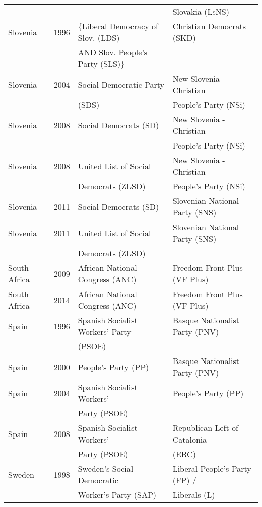 {\begin{longtable}{|l|c|l|l|}
               &      &         &  Slovakia (LsNS)   \\ 
   Slovenia & 1996 & $\lbrace$Liberal Democracy of Slov. (LDS)  &   Christian Democrats (SKD)   \\ 
    &   & AND Slov. People's Party (SLS)$\rbrace$&   \\ 
   Slovenia & 2004 &        Social Democratic Party &   New Slovenia - Christian    \\ 
               &      &      (SDS)    &    People's Party (NSi) \\ 
   Slovenia & 2008 &   Social Democrats (SD)  &   New Slovenia - Christian   \\ 
               &      &         &   People's Party (NSi)   \\ 
   Slovenia & 2008 &   United List of Social  &   New Slovenia - Christian   \\ 
               &      &     Democrats (ZLSD)    &   People's Party (NSi)   \\ 
   Slovenia & 2011 &   Social Democrats (SD)  &   Slovenian National Party (SNS) \\ 
   Slovenia & 2011 &   United List of Social  &   Slovenian National Party (SNS) \\ 
               &      &     Democrats (ZLSD)    &     \\ 
   South Africa & 2009 &   African National Congress (ANC)   &   Freedom Front Plus (VF Plus) \\ 
   South Africa & 2014 &   African National Congress (ANC)   &   Freedom Front Plus (VF Plus) \\ 
   Spain & 1996 &   Spanish Socialist Workers' Party  &   Basque Nationalist Party (PNV)   \\ 
               &      &     (PSOE)  &     \\ 
   Spain & 2000 &   People's Party (PP) &   Basque Nationalist Party (PNV)   \\ 
   Spain & 2004 &   Spanish Socialist Workers' &   People's Party (PP) \\ 
               &      &     Party (PSOE)     &     \\ 
  Spain & 2008 &   Spanish Socialist Workers'  &   Republican Left of Catalonia  \\ 
               &      &       Party (PSOE)  &    (ERC) \\ 
   Sweden & 1998 &   Sweden's   Social Democratic &   Liberal People's Party (FP) /  \\ 
               &      &  Worker's Party (SAP)      &    Liberals (L)   \\ 

\end{longtable}}
